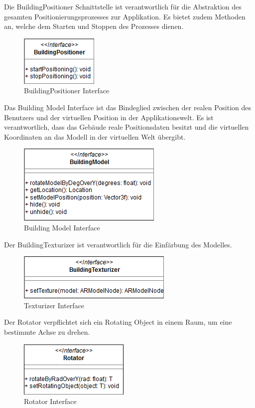 \documentclass[a4paper]{scrreprt}
\begin{document}
Die BuildingPositioner Schnittstelle ist verantwortlich für die Abstraktion des gesamten Positionierungsprozesses zur Applikation. Es bietet zudem Methoden an, welche dem Starten und Stoppen des Prozesses dienen.
\begin{figure}[h!]
	\center
	\includegraphics[scale=0.6]{BuildingPositioner.png}
	\caption{BuildingPositioner Interface}
\end{figure}
\clearpage
Das Building Model Interface ist das Bindeglied zwischen der realen Position des Benutzers und der virtuellen Position in der Applikationswelt. Es ist verantwortlich, dass das Gebäude reale Positionsdaten besitzt und die virtuellen Koordinaten an das Modell in der virtuellen Welt übergibt.

\begin{figure}[h!]
	\center
	\includegraphics[scale=0.6]{BuildingModel.png}
	\caption{Building Model Interface}
\end{figure}

Der BuildingTexturizer ist verantwortlich für die Einfärbung des Modelles.
\begin{figure}[h!]
	\center
	\includegraphics[scale=0.6]{BuildingTexturizer.png}
	\caption{Texturizer Interface}
\end{figure}


Der Rotator verpflichtet sich ein Rotating Object in einem Raum, um eine bestimmte Achse zu drehen.
\begin{figure}[h!]
	\center
	\includegraphics[scale=0.6]{Rotator.png}
	\caption{Rotator Interface}
\end{figure}
\end{document}
